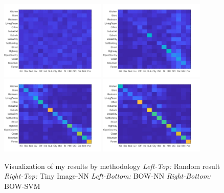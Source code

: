 \begin{figure}[h]
    \centering
    \includegraphics[width=5cm]{placeholder.jpg}
    \includegraphics[width=5cm]{ti_nn.jpg}
    \includegraphics[width=5cm]{bow_nn.jpg}
    \includegraphics[width=5cm]{bow_svm.jpg}
    \caption{Visualization of my results by methodology \emph{Left-Top:} Random result \emph{Right-Top:} Tiny Image-NN
    \emph{Left-Bottom:} BOW-NN \emph{Right-Bottom:} BOW-SVM}
    \label{fig:result1}
\end{figure}



